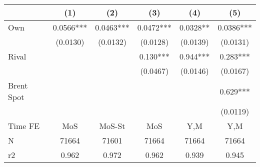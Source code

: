 {
\def\sym#1{\ifmmode^{#1}\else\(^{#1}\)\fi}
\begin{tabular}{l*{5}{c}}
\toprule
                &\multicolumn{1}{c}{(1)}   &\multicolumn{1}{c}{(2)}   &\multicolumn{1}{c}{(3)}   &\multicolumn{1}{c}{(4)}   &\multicolumn{1}{c}{(5)}   \\
\midrule
Own             &   0.0566***&   0.0463***&   0.0472***&   0.0328** &   0.0386***\\
                & (0.0130)   & (0.0132)   & (0.0128)   & (0.0139)   & (0.0131)   \\
\addlinespace
Rival           &            &            &    0.130***&    0.944***&    0.283***\\
                &            &            & (0.0467)   & (0.0146)   & (0.0167)   \\
\addlinespace
Brent Spot      &            &            &            &            &    0.629***\\
                &            &            &            &            & (0.0119)   \\
\midrule
Time FE         &      MoS   &   MoS-St   &      MoS   &      Y,M   &      Y,M   \\
N               &    71664   &    71601   &    71664   &    71664   &    71664   \\
r2              &    0.962   &    0.972   &    0.962   &    0.939   &    0.945   \\
\bottomrule
\end{tabular}
}
